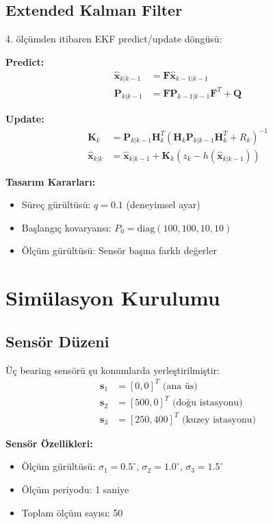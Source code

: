 \documentclass[11pt,a4paper]{article}
\begin{document}
\subsection{Extended Kalman Filter}
4. ölçümden itibaren EKF predict/update döngüsü:

\textbf{Predict:}
\begin{align}
\hat{\mathbf{x}}_{k|k-1} &= \mathbf{F} \hat{\mathbf{x}}_{k-1|k-1} \\
\mathbf{P}_{k|k-1} &= \mathbf{F} \mathbf{P}_{k-1|k-1} \mathbf{F}^T + \mathbf{Q}
\end{align}

\textbf{Update:}
\begin{align}
\mathbf{K}_k &= \mathbf{P}_{k|k-1} \mathbf{H}_k^T (\mathbf{H}_k \mathbf{P}_{k|k-1} \mathbf{H}_k^T + R_k)^{-1} \\
\hat{\mathbf{x}}_{k|k} &= \hat{\mathbf{x}}_{k|k-1} + \mathbf{K}_k (z_k - h(\hat{\mathbf{x}}_{k|k-1}))
\end{align}

\textbf{Tasarım Kararları:}
\begin{itemize}
    \item Süreç gürültüsü: $q = 0.1$ (deneyimsel ayar)
    \item Başlangıç kovaryansı: $P_0 = \text{diag}(100, 100, 10, 10)$
    \item Ölçüm gürültüsü: Sensör başına farklı değerler
\end{itemize}

\section{Simülasyon Kurulumu}

\subsection{Sensör Düzeni}
Üç bearing sensörü şu konumlarda yerleştirilmiştir:
\begin{align}
\mathbf{s}_1 &= [0, 0]^T \text{ (ana üs)} \\
\mathbf{s}_2 &= [500, 0]^T \text{ (doğu istasyonu)} \\
\mathbf{s}_3 &= [250, 400]^T \text{ (kuzey istasyonu)}
\end{align}

\textbf{Sensör Özellikleri:}
\begin{itemize}
    \item Ölçüm gürültüsü: $\sigma_1 = 0.5^\circ$, $\sigma_2 = 1.0^\circ$, $\sigma_3 = 1.5^\circ$
    \item Ölçüm periyodu: 1 saniye
    \item Toplam ölçüm sayısı: 50
\end{itemize}
\end{document}
